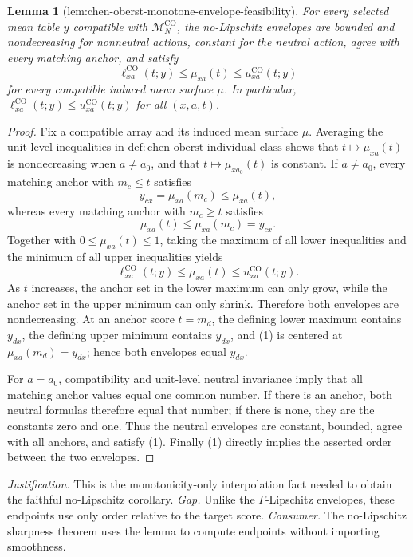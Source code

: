 \documentclass{article}
\newtheorem{lemma}{Lemma}
\begin{document}
\begin{lemma}[lem:chen-oberst-monotone-envelope-feasibility]\label{lem:chen-oberst-monotone-envelope-feasibility}
For every selected mean table \(y\) compatible with \(\mathcal M_N^{\mathrm{CO}}\), the no-Lipschitz envelopes are bounded and nondecreasing for nonneutral actions, constant for the neutral action, agree with every matching anchor, and satisfy
\[
\ell^{\mathrm{CO}}_{xa}(t;y)\leq\mu_{xa}(t)\leq u^{\mathrm{CO}}_{xa}(t;y)
\]
for every compatible induced mean surface \(\mu\).  In particular, \(\ell^{\mathrm{CO}}_{xa}(t;y)\leq u^{\mathrm{CO}}_{xa}(t;y)\) for all \((x,a,t)\).
\end{lemma}
\begin{proof}
Fix a compatible array and its induced mean surface \(\mu\).  Averaging the unit-level inequalities in \(\mathrm{def{:}chen\text{-}oberst\text{-}individual\text{-}class}\) shows that \(t\mapsto\mu_{xa}(t)\) is nondecreasing when \(a\neq a_0\), and that \(t\mapsto\mu_{x a_0}(t)\) is constant.  If \(a\neq a_0\), every matching anchor with \(m_c\leq t\) satisfies
\[
y_{cx}=\mu_{xa}(m_c)\leq\mu_{xa}(t),
\]
whereas every matching anchor with \(m_c\geq t\) satisfies
\[
\mu_{xa}(t)\leq\mu_{xa}(m_c)=y_{cx}.
\]
Together with \(0\leq\mu_{xa}(t)\leq1\), taking the maximum of all lower inequalities and the minimum of all upper inequalities yields
\[
\ell^{\mathrm{CO}}_{xa}(t;y)\leq\mu_{xa}(t)\leq u^{\mathrm{CO}}_{xa}(t;y).
\tag{1}
\]
As \(t\) increases, the anchor set in the lower maximum can only grow, while the anchor set in the upper minimum can only shrink.  Therefore both envelopes are nondecreasing.  At an anchor score \(t=m_d\), the defining lower maximum contains \(y_{dx}\), the defining upper minimum contains \(y_{dx}\), and (1) is centered at \(\mu_{xa}(m_d)=y_{dx}\); hence both envelopes equal \(y_{dx}\).

For \(a=a_0\), compatibility and unit-level neutral invariance imply that all matching anchor values equal one common number.  If there is an anchor, both neutral formulas therefore equal that number; if there is none, they are the constants zero and one.  Thus the neutral envelopes are constant, bounded, agree with all anchors, and satisfy (1).  Finally (1) directly implies the asserted order between the two envelopes.
\end{proof}
\par\smallskip\noindent \textit{Justification.} This is the monotonicity-only interpolation fact needed to obtain the faithful no-Lipschitz corollary. \textit{Gap.} Unlike the \(\Gamma\)-Lipschitz envelopes, these endpoints use only order relative to the target score. \textit{Consumer.} The no-Lipschitz sharpness theorem uses the lemma to compute endpoints without importing smoothness.
\end{document}
